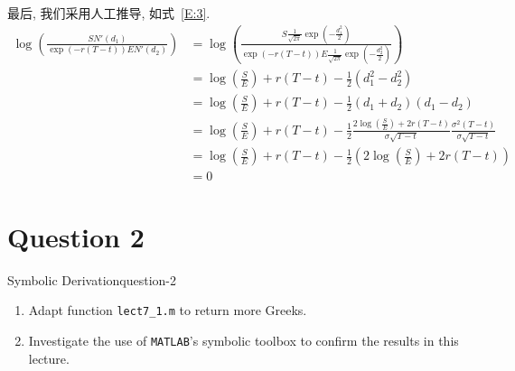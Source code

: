 最后, 我们采用人工推导, 如式~\eqref{E:3}.
\begin{equation}\label{E:3}
    \begin{aligned}
        \log\left(\frac{SN'(d_1)}{\exp\left(-r(T-t)\right)EN'(d_2)}\right) &= \log\left(\frac{S\frac{1}{\sqrt{2\pi}}\exp\left(-\frac{d_1^2}{2}\right)}{\exp\left(-r(T-t)\right)E\frac{1}{\sqrt{2\pi}}\exp\left(-\frac{d_2^2}{2}\right)}\right) \\
        &= \log\left(\frac{S}{E}\right) + r(T-t) - \frac{1}{2}\left(d_1^2-d_2^2\right) \\
        &= \log\left(\frac{S}{E}\right) + r(T-t) - \frac{1}{2}(d_1+d_2)(d_1-d_2) \\
        &= \log\left(\frac{S}{E}\right) + r(T-t) - \frac{1}{2}\frac{2\log\left(\frac{S}{E}\right)+2r(T-t)}{\sigma\sqrt{T-t}}\frac{\sigma^2(T-t)}{\sigma\sqrt{T-t}} \\
        &= \log\left(\frac{S}{E}\right) + r(T-t) - \frac{1}{2}\left(2\log\left(\frac{S}{E}\right)+2r(T-t)\right) \\
        &= 0
    \end{aligned}
\end{equation}



\section{Question 2}
\begin{statebox}{Symbolic Derivation}{question-2}
    \begin{enumerate}
        \item Adapt function \texttt{lect7\_1.m} to return more Greeks.
        \item Investigate the use of \texttt{MATLAB}'s symbolic toolbox to confirm the results in this lecture.
    \end{enumerate}
\end{statebox}

\noindent{}

